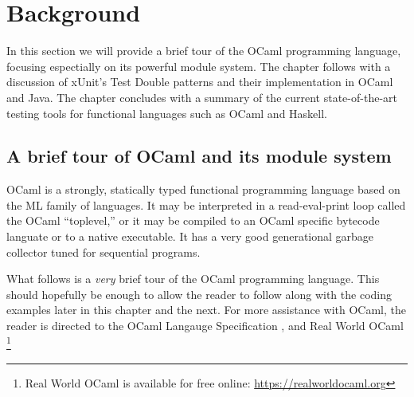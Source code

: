 \chapter{Background}
\label{background}

In this section we will provide a brief tour of the OCaml programming
language, focusing espectially on its powerful module system. The
chapter follows with a discussion of xUnit's Test Double patterns and
their implementation in OCaml and Java. The chapter concludes with a
summary of the current state-of-the-art testing tools for functional
languages such as OCaml and Haskell.

\section{A brief tour of OCaml and its module system}
\label{ocaml}




OCaml is a strongly, statically typed functional programming language
based on the ML family of languages. It may be interpreted in a
read-eval-print loop called the OCaml ``toplevel,'' or it may be
compiled to an OCaml specific bytecode languate or to a native
executable. \cite{ocaml:spec} It has a very good generational garbage
collector tuned for sequential programs. \cite{ocaml:gc_tutorial}

What follows is a \textit{very} brief tour of the OCaml programming
language. This should hopefully be enough to allow the reader to
follow along with the coding examples later in this chapter and the
next. For more assistance with OCaml, the reader is directed to the
OCaml Langauge Specification \cite{ocaml:spec}, and Real World OCaml
\cite{rwo}\footnote{Real World OCaml is available for free online:
  \url{https://realworldocaml.org}}

